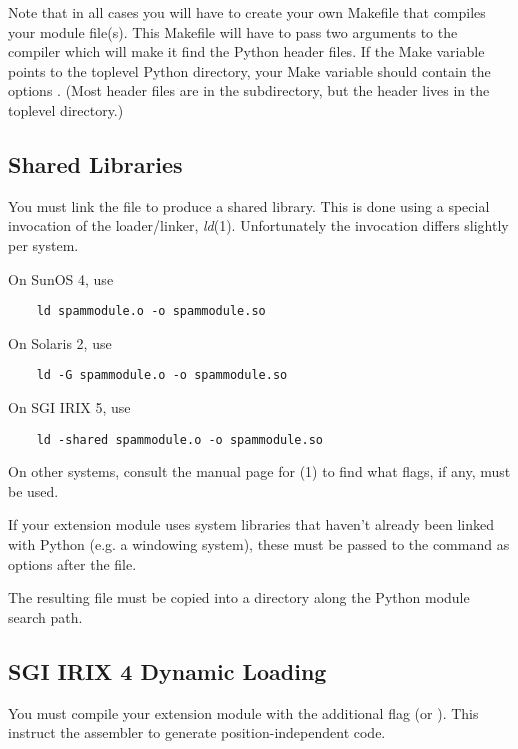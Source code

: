 \documentclass[twoside,openright]{report}
\begin{document}
Note that in all cases you will have to create your own Makefile that
compiles your module file(s).  This Makefile will have to pass two
 arguments to the \C{} compiler which will make it find the
Python header files.  If the Make variable  points to
the toplevel Python directory, your  Make variable should
contain the options .
(Most header files are in the  subdirectory, but the
 header lives in the toplevel directory.)


\subsection{Shared Libraries}

You must link the  file to produce a shared library.  This is 
done using a special invocation of the \UNIX{} loader/linker,
\emph{ld}(1).  Unfortunately the invocation differs slightly per
system.

On SunOS 4, use
\bcode\begin{verbatim}
    ld spammodule.o -o spammodule.so
\end{verbatim}\ecode
%
On Solaris 2, use
\bcode\begin{verbatim}
    ld -G spammodule.o -o spammodule.so
\end{verbatim}\ecode
%
On SGI IRIX 5, use
\bcode\begin{verbatim}
    ld -shared spammodule.o -o spammodule.so
\end{verbatim}\ecode
%
On other systems, consult the manual page for (1) to find what
flags, if any, must be used.

If your extension module uses system libraries that haven't already
been linked with Python (e.g. a windowing system), these must be
passed to the  command as  options after the
 file.

The resulting file  must be copied into a directory
along the Python module search path.


\subsection{SGI IRIX 4 Dynamic Loading}

 You must compile your extension module with the
additional \C{} flag  (or ).  This instruct the
assembler to generate position-independent code.
\end{document}
